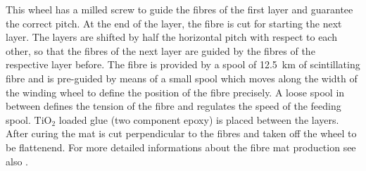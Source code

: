 This wheel has a milled screw to guide the fibres of the first layer and guarantee the correct pitch. At the end of the layer, the fibre is cut for starting the next layer. The layers are shifted by half the horizontal pitch with respect to each other, so that the fibres of the next layer are guided by the fibres of the respective layer before. The fibre is provided by a spool of \SI{12.5}{\kilo\metre} of scintillating fibre and is pre-guided by means of a small spool which moves along the width of the winding wheel to define the position of the fibre precisely. A loose spool in between defines the tension of the fibre and regulates the speed of the feeding spool.
$\text{TiO}_2$ loaded glue (two component epoxy) is placed between the layers. After curing the mat is cut perpendicular to the fibres and taken off the wheel to be flattenend.
For more detailed informations about the fibre mat production see also \cite{FibreMatProduction}.

